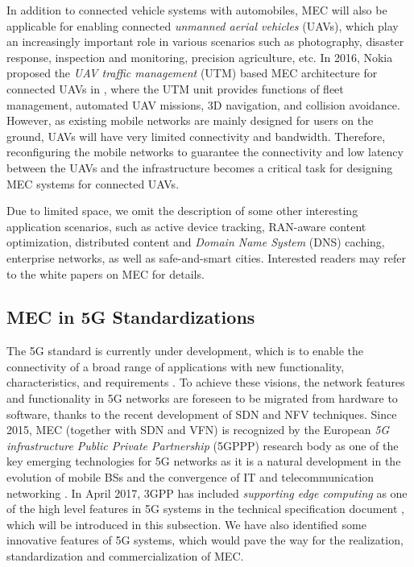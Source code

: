 \documentclass[journal]{IEEEtran}
\begin{document}
{{\color{black}
In addition to connected vehicle systems with automobiles, MEC will also be applicable for enabling connected \emph{unmanned aerial vehicles} (UAVs), which play an increasingly important role in various scenarios such as photography, disaster response, inspection and monitoring, precision agriculture, etc. In 2016, Nokia proposed the \emph{UAV traffic management} (UTM) based MEC architecture for connected UAVs in \cite{UTMinfrastSlides16}, where the UTM unit provides functions of fleet management, automated UAV missions, 3D navigation, and collision avoidance. However, as existing mobile networks are mainly designed for users on the ground, UAVs will have very limited connectivity and bandwidth. Therefore, reconfiguring the mobile networks to guarantee the connectivity and low latency between the UAVs and the infrastructure becomes a critical task for designing MEC systems for connected UAVs.
}

Due to limited space, we omit the description of some other interesting application scenarios, such as active device tracking, RAN-aware content optimization, distributed content and \emph{Domain Name System} (DNS) caching, enterprise networks, as well as safe-and-smart cities. Interested readers may refer to the white papers on MEC \cite{ETSI14,Saguna_intel,Juniper} for details.

{\color{black}\subsection{MEC in 5G Standardizations}

The 5G standard is currently under development, which is to enable the connectivity of a broad range of applications with new functionality, characteristics, and requirements \cite{ericssonWhitepaper}. To achieve these visions, the network features and functionality in 5G networks are foreseen to be migrated from hardware to software, thanks to the recent development of SDN and NFV techniques. Since 2015, MEC (together with SDN and VFN) is recognized by the European \emph{5G infrastructure Public Private Partnership} (5GPPP) research body as one of the key emerging technologies for 5G networks as it is a natural development in the evolution of mobile BSs and the convergence of IT and telecommunication networking \cite{hu2015mobile}. In April 2017, 3GPP has included \emph{supporting edge computing} as one of the high level features in 5G systems in the technical specification document \cite{3GPPTS23501}, which will be introduced in this subsection. We have also identified some innovative features of 5G systems, which would pave the way for the realization, standardization and commercialization of MEC.

}}
\end{document}

